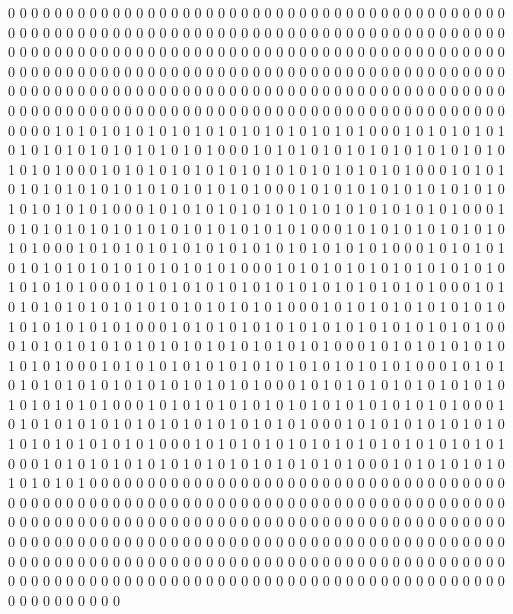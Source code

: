 0 0 0 0 0 0 0 0 0 0 0 0 0 0 0 0 0 0 0 0 0 0 0 0 0 0 0 0 0 0 0 0 0 0 0 0 0 0 0 0 0 0 0 0 0 0 0 0 0 0 0 0 0 0 0 0 0 0 0 0 0 0 0 0 0 0 0 0 0 0 0 0 0 0 0 0 0 0 0 0 0 0 0 0 0 0 0 0 0 0 0 0 0 0 0 0 0 0 0 0 0 0 0 0 0 0 0 0 0 0 0 0 0 0 0 0 0 0 0 0 0 0 0 0 0 0 0 0 0 0 0 0 0 0 0 0 0 0 0 0 0 0 0 0 0 0 0 0 0 0 0 0 0 0 0 0 0 0 0 0 0 0 0 0 0 0 0 0 0 0 0 0 0 0 0 0 0 0 0 0 0 0 0 0 0 0 0 0 0 0 0 0 0 0 0 0 0 0 0 0 0 0 0 0 0 0 0 0 0 0 0 0 0 0 0 0 0 0 0 0 0 0 0 0 0 0 0 0 0 0 0 0 0 0 0 0 0 0 0 0 0 0 0 0 0 0 0 0 0 0 0 0 0 0 0 0 0 0 0 0 
0 0 1 0 1 0 1 0 1 0 1 0 1 0 1 0 1 0 1 0 1 0 1 0 1 0 1 0 1 0 0 0 1 0 1 0 1 0 1 0 1 0 1 0 1 0 1 0 1 0 1 0 1 0 1 0 1 0 1 0 0 0 1 0 1 0 1 0 1 0 1 0 1 0 1 0 1 0 1 0 1 0 1 0 1 0 1 0 1 0 0 0 1 0 1 0 1 0 1 0 1 0 1 0 1 0 1 0 1 0 1 0 1 0 1 0 1 0 1 0 0 0 1 0 1 0 1 0 1 0 1 0 1 0 1 0 1 0 1 0 1 0 1 0 1 0 1 0 1 0 0 0 1 0 1 0 1 0 1 0 1 0 1 0 1 0 1 0 1 0 1 0 1 0 1 0 1 0 1 0 0 0 1 0 1 0 1 0 1 0 1 0 1 0 1 0 1 0 1 0 1 0 1 0 1 0 1 0 1 0 0 0 1 0 1 0 1 0 1 0 1 0 1 0 1 0 1 0 1 0 1 0 1 0 1 0 1 0 1 0 0 0 1 0 1 0 1 0 1 0 1 0 1 0 1 0 1 0 1 0 
0 0 1 0 1 0 1 0 1 0 1 0 1 0 1 0 1 0 1 0 1 0 1 0 1 0 1 0 1 0 0 0 1 0 1 0 1 0 1 0 1 0 1 0 1 0 1 0 1 0 1 0 1 0 1 0 1 0 1 0 0 0 1 0 1 0 1 0 1 0 1 0 1 0 1 0 1 0 1 0 1 0 1 0 1 0 1 0 1 0 0 0 1 0 1 0 1 0 1 0 1 0 1 0 1 0 1 0 1 0 1 0 1 0 1 0 1 0 1 0 0 0 1 0 1 0 1 0 1 0 1 0 1 0 1 0 1 0 1 0 1 0 1 0 1 0 1 0 1 0 0 0 1 0 1 0 1 0 1 0 1 0 1 0 1 0 1 0 1 0 1 0 1 0 1 0 1 0 1 0 0 0 1 0 1 0 1 0 1 0 1 0 1 0 1 0 1 0 1 0 1 0 1 0 1 0 1 0 1 0 0 0 1 0 1 0 1 0 1 0 1 0 1 0 1 0 1 0 1 0 1 0 1 0 1 0 1 0 1 0 0 0 1 0 1 0 1 0 1 0 1 0 1 0 1 0 1 0 1 0 
0 0 1 0 1 0 1 0 1 0 1 0 1 0 1 0 1 0 1 0 1 0 1 0 1 0 1 0 1 0 0 0 1 0 1 0 1 0 1 0 1 0 1 0 1 0 1 0 1 0 1 0 1 0 1 0 1 0 1 0 0 0 1 0 1 0 1 0 1 0 1 0 1 0 1 0 1 0 1 0 1 0 1 0 1 0 1 0 1 0 0 0 1 0 1 0 1 0 1 0 1 0 1 0 1 0 1 0 1 0 1 0 1 0 1 0 1 0 1 0 0 0 1 0 1 0 1 0 1 0 1 0 1 0 1 0 1 0 1 0 1 0 1 0 1 0 1 0 1 0 0 0 1 0 1 0 1 0 1 0 1 0 1 0 1 0 1 0 1 0 1 0 1 0 1 0 1 0 1 0 0 0 1 0 1 0 1 0 1 0 1 0 1 0 1 0 1 0 1 0 1 0 1 0 1 0 1 0 1 0 0 0 1 0 1 0 1 0 1 0 1 0 1 0 1 0 1 0 1 0 1 0 1 0 1 0 1 0 1 0 0 0 1 0 1 0 1 0 1 0 1 0 1 0 1 0 1 0 1 0 
0 0 0 0 0 0 0 0 0 0 0 0 0 0 0 0 0 0 0 0 0 0 0 0 0 0 0 0 0 0 0 0 0 0 0 0 0 0 0 0 0 0 0 0 0 0 0 0 0 0 0 0 0 0 0 0 0 0 0 0 0 0 0 0 0 0 0 0 0 0 0 0 0 0 0 0 0 0 0 0 0 0 0 0 0 0 0 0 0 0 0 0 0 0 0 0 0 0 0 0 0 0 0 0 0 0 0 0 0 0 0 0 0 0 0 0 0 0 0 0 0 0 0 0 0 0 0 0 0 0 0 0 0 0 0 0 0 0 0 0 0 0 0 0 0 0 0 0 0 0 0 0 0 0 0 0 0 0 0 0 0 0 0 0 0 0 0 0 0 0 0 0 0 0 0 0 0 0 0 0 0 0 0 0 0 0 0 0 0 0 0 0 0 0 0 0 0 0 0 0 0 0 0 0 0 0 0 0 0 0 0 0 0 0 0 0 0 0 0 0 0 0 0 0 0 0 0 0 0 0 0 0 0 0 0 0 0 0 0 0 0 0 0 0 0 0 0 0 0 0 0 0 0 0 0 0 0 0 0 0 
